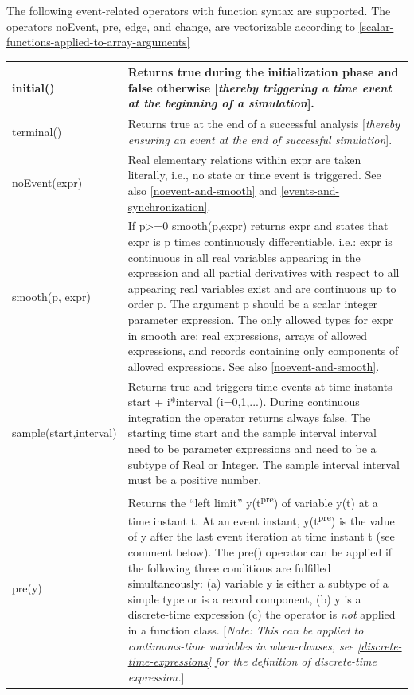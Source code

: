 \documentclass[10pt,a4paper]{report}
\begin{document}
The following event-related operators with function syntax are
supported. The operators noEvent, pre, edge, and change, are
vectorizable according to \ref{scalar-functions-applied-to-array-arguments}

\begin{longtable}{|p{5cm}|p{8cm}|} \hline
initial() & Returns true during the initialization phase and false
otherwise {[}\emph{thereby triggering a time event at the beginning of a
simulation}{]}.\\ \hline
terminal() & Returns true at the end of a successful analysis
{[}\emph{thereby ensuring an event at the end of successful
simulation}{]}.\\ \hline
noEvent(expr) & Real elementary relations within expr are taken
literally, i.e., no state or time event is triggered. See also \ref{noevent-and-smooth} and \ref{events-and-synchronization}.\\ \hline
smooth(p, expr) & If p\textgreater{}=0 smooth(p,expr)
returns expr and states that expr is p times continuously
differentiable, i.e.: expr is continuous in all real variables appearing
in the expression and all partial derivatives with respect to all
appearing real variables exist and are continuous up to order
p. The argument p should be a scalar integer parameter
expression. The only allowed types for expr in smooth are: real
expressions, arrays of allowed expressions, and records containing only
components of allowed expressions. See also \ref{noevent-and-smooth}.\\ \hline
sample(start,interval) & Returns true and triggers time events at time
instants start + i*interval (i=0,1,...). During continuous integration
the operator returns always false. The starting time start and the
sample interval interval need to be parameter expressions and need to be
a subtype of Real or Integer. The sample interval interval must be a
positive number.\\ \hline
pre(y) & Returns the ``left limit'' y(t\textsuperscript{pre}) of
variable y(t) at a time instant t. At an event instant,
y(t\textsuperscript{pre}) is the value of y after the last event
iteration at time instant t (see comment below). The pre() operator can
be applied if the following three conditions are fulfilled
simultaneously: (a) variable y is either a subtype of a simple type or
is a record component, (b) y is a discrete-time expression (c) the
operator is \emph{not} applied in a function class. {[}\emph{Note: This
can be applied to continuous-time variables in when-clauses, see
\ref{discrete-time-expressions} for the definition of discrete-time expression.}{]}

\end{longtable}
\end{document}
